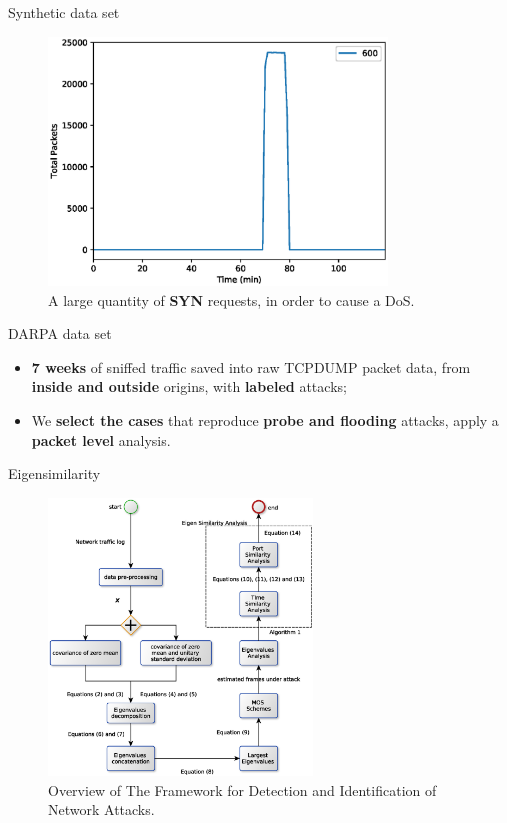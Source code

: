 \documentclass[newPxFont, numfooter, sectionpages]{beamer}
\begin{document}
\begin{frame}[c]{Synthetic data set}
	
	\begin{figure}[h!]
	     \centering 
	     \includegraphics[width=9cm]{figures/ch2/synflood_traffic.eps}
	     \caption{A large quantity of \textbf{SYN} requests, in order to cause a DoS.}
	     \label{fig:2_fig5}
	\end{figure}

\end{frame}

\begin{frame}{DARPA data set}
	\begin{itemize}
	    \item \textbf{7 weeks} of sniffed traffic saved into raw TCPDUMP packet data, from \textbf{inside and outside} origins, with \textbf{labeled} attacks;
	    \item We \textbf{select the cases} that reproduce \textbf{probe and flooding} attacks, apply a \textbf{packet level} analysis.
	\end{itemize}
\end{frame}

\begin{frame}{Eigensimilarity}
	\begin{figure}[h!]
		\centering
	     \includegraphics[width=7cm]{figures/ch2/mos_eigen_similarity.eps}
	     \caption{Overview of The Framework for Detection and Identification of Network Attacks.}
	     \label{fig:2_fig80}
	\end{figure}
\end{frame}
\end{document}
